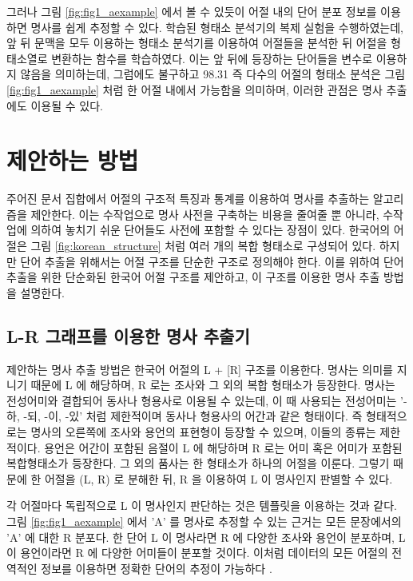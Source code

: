 \documentclass[oneside, ko,phd]{snuthesis_utf8_kor}
\begin{document}
그러나 그림 \ref{fig:fig1_aexample} 에서 볼 수 있듯이 어절 내의 단어 분포 정보를 이용하면 명사를 쉽게 추정할 수 있다.
\cite{shim2016cloning} 학습된 형태소 분석기의 복제 실험을 수행하였는데, 앞 뒤 문맥을 모두 이용하는 형태소 분석기를 이용하여 어절들을 분석한 뒤 어절을 형태소열로 변환하는 함수를 학습하였다.
이는 앞 뒤에 등장하는 단어들을 변수로 이용하지 않음을 의미하는데, 그럼에도 불구하고 98.31 %
즉 다수의 어절의 형태소 분석은 그림 \ref{fig:fig1_aexample} 처럼 한 어절 내에서 가능함을 의미하며, 이러한 관점은 명사 추출에도 이용될 수 있다.




\section{제안하는 방법}

주어진 문서 집합에서 어절의 구조적 특징과 통계를 이용하여 명사를 추출하는 알고리즘을 제안한다.
이는 수작업으로 명사 사전을 구축하는 비용을 줄여줄 뿐 아니라, 수작업에 의하여 놓치기 쉬운 단어들도 사전에 포함할 수 있다는 장점이 있다.
한국어의 어절은 그림 \ref{fig:korean_structure} 처럼 여러 개의 복합 형태소로 구성되어 있다.
하지만 단어 추출을 위해서는 어절 구조를 단순한 구조로 정의해야 한다.
이를 위하여 단어 추출을 위한 단순화된 한국어 어절 구조를 제안하고, 이 구조를 이용한 명사 추출 방법을 설명한다.

\subsection{L-R 그래프를 이용한 명사 추출기}

제안하는 명사 추출 방법은 한국어 어절의 L + [R] 구조를 이용한다.
명사는 의미를 지니기 때문에 L 에 해당하며, R 로는 조사와 그 외의 복합 형태소가 등장한다.
명사는 전성어미와 결합되어 동사나 형용사로 이용될 수 있는데, 이 때 사용되는 전성어미는 '-하, -되, -이, -있' 처럼 제한적이며 동사나 형용사의 어간과 같은 형태이다.
즉 형태적으로는 명사의 오른쪽에 조사와 용언의 표현형이 등장할 수 있으며, 이들의 종류는 제한적이다.
용언은 어간이 포함된 음절이 L 에 해당하며 R 로는 어미 혹은 어미가 포함된 복합형태소가 등장한다.
그 외의 품사는 한 형태소가 하나의 어절을 이룬다.
그렇기 때문에 한 어절을 (L, R) 로 분해한 뒤, R 을 이용하여 L 이 명사인지 판별할 수 있다.

각 어절마다 독립적으로 L 이 명사인지 판단하는 것은 템플릿을 이용하는 것과 같다.
그림 \ref{fig:fig1_aexample} 에서 'A' 를 명사로 추정할 수 있는 근거는 모든 문장에서의 'A' 에 대한 R 분포다.
한 단어 L 이 명사라면 R 에 다양한 조사와 용언이 분포하며, L 이 용언이라면 R 에 다양한 어미들이 분포할 것이다.
이처럼 데이터의 모든 어절의 전역적인 정보를 이용하면 정확한 단어의 추정이 가능하다 \cite{zhao2007incorporating}.
\end{document}
